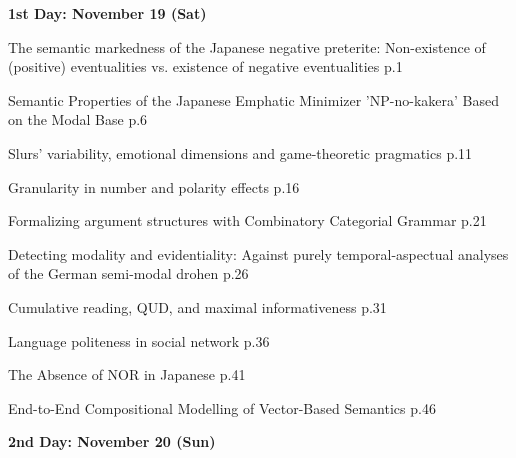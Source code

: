 \documentclass[12pt]{jarticle}
\begin{document}
\noindent\textbf{\large 
1st Day: November 19 (Sat)
}\\






 
  
     {The semantic markedness of the Japanese negative preterite: Non-existence of (positive) eventualities vs. existence of negative eventualities}
     {p.1}
  
     {Semantic Properties of the Japanese Emphatic Minimizer 'NP-no-kakera' Based on the Modal Base}
     {p.6}
  
     {Slurs' variability, emotional dimensions and game-theoretic pragmatics}
     {p.11}



 
  
     {Granularity in number and polarity effects}
     {p.16}
  
     {Formalizing argument structures with Combinatory Categorial Grammar}
     {p.21}
  
     {Detecting modality and evidentiality: Against purely temporal-aspectual analyses of the German semi-modal drohen}
     {p.26}



 
  
     {Cumulative reading, QUD, and maximal informativeness}
     {p.31}
  
     {Language politeness in social network}
     {p.36}
  
     {The Absence of NOR in Japanese}
     {p.41}




  
     {End-to-End Compositional Modelling of Vector-Based Semantics}
     {p.46}




\noindent\textbf{\large 
2nd Day: November 20 (Sun)
}\\



\end{document}
